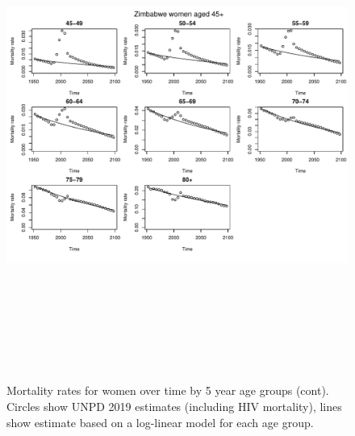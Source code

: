 \documentclass{article}
\begin{document}
\begin{figure}
\includegraphics[width=16cm,height=16cm]{EstimatingRatesFromUNPDv2-MortalityWomen2} 

\caption{Mortality rates for women over time by 5 year age groups (cont). Circles show UNPD 2019 estimates (including HIV mortality), lines show estimate based on a log-linear model for each age group.}
\label{Mortalitywomen1}
\end{figure}



\clearpage
\end{document}
